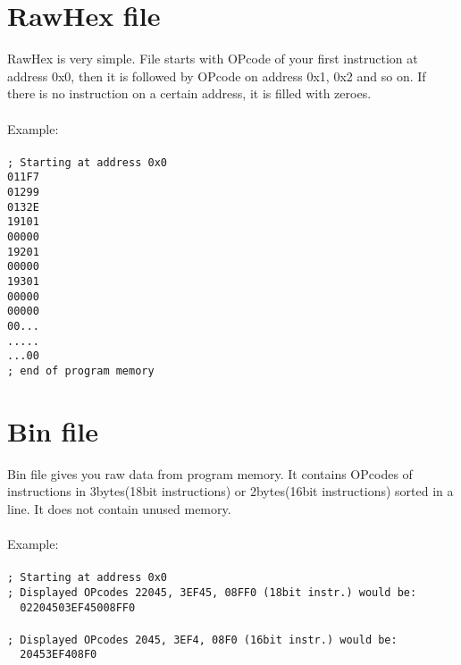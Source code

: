         \section{RawHex file}
             RawHex is very simple. File starts with OPcode of your first instruction at address 0x0, then it is followed by OPcode on address 0x1, 0x2
             and so on. If there is no instruction on a certain address, it is filled with zeroes.\\\\
             Example:
            {
                ~\\
                \usecodefont\\
                \verb'; Starting at address 0x0'\\
                \verb'011F7'\\
                \verb'01299'\\
                \verb'0132E'\\
                \verb'19101'\\
                \verb'00000'\\
                \verb'19201'\\
                \verb'00000'\\
                \verb'19301'\\
                \verb'00000'\\
                \verb'00000'\\
                \verb'00...'\\
                \verb'.....'\\
                \verb'...00'\\
                \verb'; end of program memory'\\
            }
        \section{Bin file}
        Bin file gives you raw data from program memory. It contains OPcodes of instructions in 3bytes(18bit instructions) or 2bytes(16bit instructions)
        sorted in a line. It does not contain unused memory.\\\\
            Example:
            {
                ~\\
                \usecodefont\\
                \verb'; Starting at address 0x0'\\
                \verb'; Displayed OPcodes 22045, 3EF45, 08FF0 (18bit instr.) would be:'\\
                \verb'  02204503EF45008FF0 '\\\\
                \verb'; Displayed OPcodes 2045, 3EF4, 08F0 (16bit instr.) would be:'\\
                \verb'  20453EF408F0 '\\
            }

